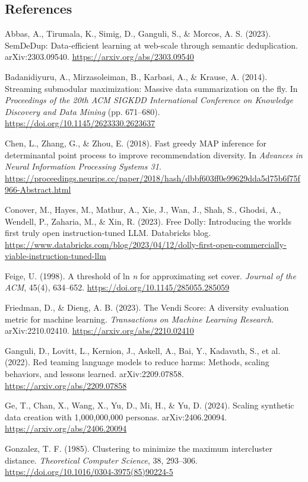 \documentclass[
  10pt,
]{article}
\theoremstyle{plain}
\theoremstyle{definition}
\begin{document}
\subsection{References}\label{references}

Abbas, A., Tirumala, K., Simig, D., Ganguli, S., \& Morcos, A. S.
(2023). SemDeDup: Data-efficient learning at web-scale through semantic
deduplication. arXiv:2303.09540. \url{https://arxiv.org/abs/2303.09540}

Badanidiyuru, A., Mirzasoleiman, B., Karbasi, A., \& Krause, A. (2014).
Streaming submodular maximization: Massive data summarization on the
fly. In \emph{Proceedings of the 20th ACM SIGKDD International
Conference on Knowledge Discovery and Data Mining} (pp. 671--680).
\url{https://doi.org/10.1145/2623330.2623637}

Chen, L., Zhang, G., \& Zhou, E. (2018). Fast greedy MAP inference for
determinantal point process to improve recommendation diversity. In
\emph{Advances in Neural Information Processing Systems 31}.
\url{https://proceedings.neurips.cc/paper/2018/hash/dbbf603ff0e99629dda5d75b6f75f966-Abstract.html}

Conover, M., Hayes, M., Mathur, A., Xie, J., Wan, J., Shah, S., Ghodsi,
A., Wendell, P., Zaharia, M., \& Xin, R. (2023). Free Dolly: Introducing
the world\textquotesingle s first truly open instruction-tuned LLM.
Databricks blog.
\url{https://www.databricks.com/blog/2023/04/12/dolly-first-open-commercially-viable-instruction-tuned-llm}

Feige, U. (1998). A threshold of ln \emph{n} for approximating set
cover. \emph{Journal of the ACM}, 45(4), 634--652.
\url{https://doi.org/10.1145/285055.285059}

Friedman, D., \& Dieng, A. B. (2023). The Vendi Score: A diversity
evaluation metric for machine learning. \emph{Transactions on Machine
Learning Research}. arXiv:2210.02410.
\url{https://arxiv.org/abs/2210.02410}

Ganguli, D., Lovitt, L., Kernion, J., Askell, A., Bai, Y., Kadavath, S.,
et al. (2022). Red teaming language models to reduce harms: Methods,
scaling behaviors, and lessons learned. arXiv:2209.07858.
\url{https://arxiv.org/abs/2209.07858}

Ge, T., Chan, X., Wang, X., Yu, D., Mi, H., \& Yu, D. (2024). Scaling
synthetic data creation with 1,000,000,000 personas. arXiv:2406.20094.
\url{https://arxiv.org/abs/2406.20094}

Gonzalez, T. F. (1985). Clustering to minimize the maximum intercluster
distance. \emph{Theoretical Computer Science}, 38, 293--306.
\url{https://doi.org/10.1016/0304-3975(85)90224-5}
\end{document}
